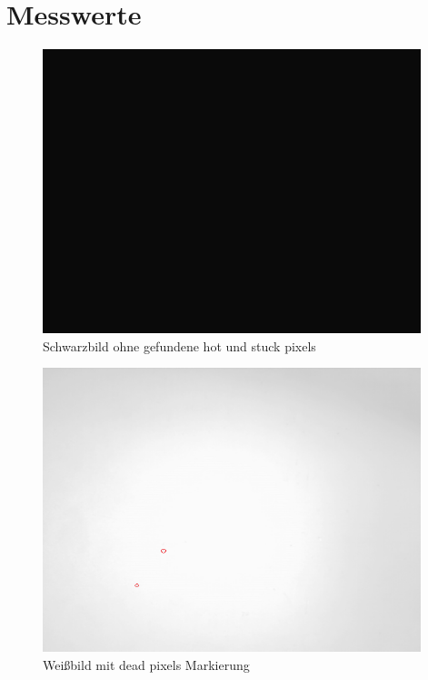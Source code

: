 \documentclass[12pt, oneside, a4paper, \docLanguage]{report}
\begin{document}
\section{Messwerte}
\label{chap:VERSUCH_4_MESSWERTE}
\begin{figure}[H]
	\centering\small
	\includegraphics[width=11cm]{mBlack.png}
	\caption{Schwarzbild ohne gefundene hot und stuck pixels }
\end{figure}
\begin{figure}[H]
	\centering\small
	\includegraphics[width=11cm]{mWhitev4.png}
	\caption{Weißbild mit dead pixels Markierung}
\end{figure}
\end{document}
